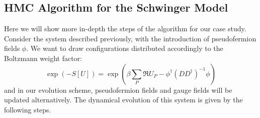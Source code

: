 \subsection{HMC Algorithm for the Schwinger Model}
Here we will show more in-depth the steps of the algorithm for our case study.
\\ Consider the system described previously, with the introduction of pseudofermion fields $\phi$. We want to draw configurations distributed accordingly to the Boltzmann weight factor:
\begin{equation}
    \exp(-S[U]) = \exp(\beta \sum_P \Re{U_P} - \phi^\dagger (DD^\dagger)^{-1}\phi )
\end{equation}
and in our evolution scheme, pseudofermion fields and gauge fields will be updated alternatively. The dynamical evolution of this system is given by the following steps.
